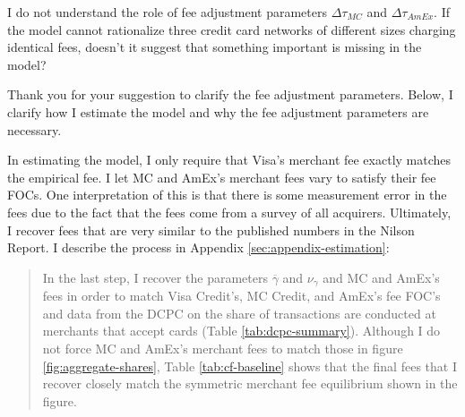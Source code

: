 \documentclass[main.tex]{subfiles}
\begin{document}
\begin{refsection}


\begin{refcommentnoclear}
I do not understand the role of fee adjustment parameters \(\Delta\tau_{MC}\) and \(\Delta\tau_{AmEx}\).
If the model cannot rationalize three credit card networks of different sizes charging identical fees, doesn't it suggest that something important is missing in the model?
\end{refcommentnoclear}

Thank you for your suggestion to clarify the fee adjustment parameters.
Below, I clarify how I estimate the model and why the fee adjustment parameters are necessary.

In estimating the model, I only require that Visa's merchant fee exactly matches the empirical fee.
I let MC and AmEx's merchant fees vary to satisfy their fee FOCs.
One interpretation of this is that there is some measurement error in the fees due to the fact that the fees come from a survey of all acquirers.
Ultimately, I recover fees that are very similar to the published numbers in the Nilson Report.
I describe the process in Appendix \ref{sec:appendix-estimation}:

\begin{quote}
    In the last step, I recover the parameters $\overline{\gamma}$ and $\nu_\gamma$ and MC and AmEx's fees in order to match Visa Credit's, MC Credit, and AmEx's fee FOC's and data from the DCPC on the share of transactions are conducted at merchants that accept cards (Table \ref{tab:dcpc-summary}).
Although I do not force MC and AmEx's merchant fees to match those in figure \ref{fig:aggregate-shares}, Table \ref{tab:cf-baseline} shows that the final fees that I recover closely match the symmetric merchant fee equilibrium shown in the figure.
\end{quote}


\end{refsection}
\end{document}
